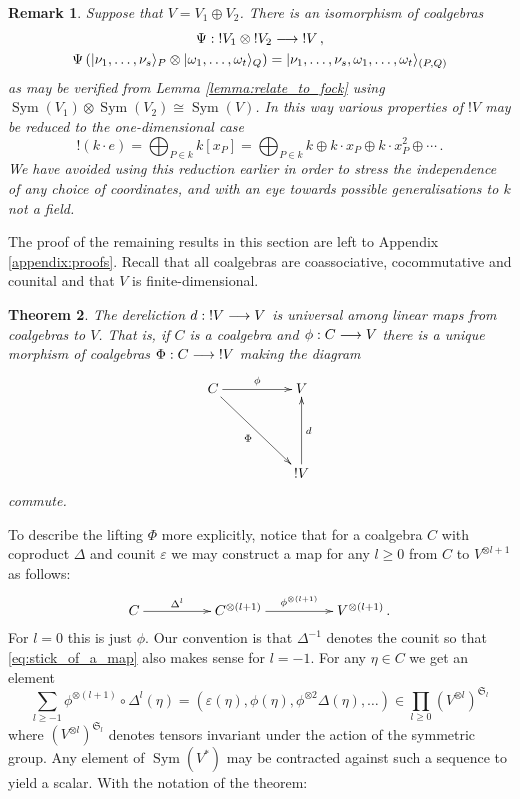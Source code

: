 \documentclass[english,letter paper,12pt,reqno]{article}
\DeclarePairedDelimiter\ket{\lvert}{\rangle}
\newtheorem{theorem}{Theorem}[section]
\theoremstyle{example}
\newtheorem{remark}[theorem]{Remark}
\numberwithin{equation}{section}
\DeclareMathOperator{\Sym}{Sym}
\begin{document}
\begin{remark}\label{remark_additive_iso} Suppose that $V = V_1 \oplus V_2$. There is an isomorphism of coalgebras
\begin{gather*}
\Psi: {!} V_1 \otimes {!} V_2 \lto {!} V\,,\\
\Psi\left( \ket{\nu_1,\ldots,\nu_s}_P \otimes \ket{\omega_1,\ldots,\omega_t}_Q \right) = \ket{\nu_1,\ldots,\nu_s,\omega_1,\ldots,\omega_t}_{(P,Q)}
\end{gather*}
as may be verified from Lemma \ref{lemma:relate_to_fock} using $\Sym(V_1) \otimes \Sym(V_2) \cong \Sym(V)$. In this way various properties of ${!} V$ may be reduced to the one-dimensional case
\[
{!} ( k \cdot e ) = \bigoplus_{P \in k} k[x_P] = \bigoplus_{P \in k} k \oplus k \cdot x_P \oplus k \cdot x_P^2 \oplus \cdots\,.
\]
We have avoided using this reduction earlier in order to stress the independence of any choice of coordinates, and with an eye towards possible generalisations to $k$ not a field.
\end{remark}

The proof of the remaining results in this section are left to Appendix \ref{appendix:proofs}. Recall that all coalgebras are coassociative, cocommutative and counital and that $V$ is finite-dimensional.

\begin{theorem}\label{theorem:main} The dereliction $d: {!}V \longrightarrow V$ is universal among linear maps from coalgebras to $V$. That is, if $C$ is a coalgebra and $\phi: C \longrightarrow V$ there is a unique morphism of coalgebras $\Phi: C \longrightarrow {!}V$ making the diagram
\begin{equation}\label{eq:defining_philift2}
\xymatrix@C+2pc@R+2pc{
C \ar[r]^-{\phi}\ar[dr]_-{\Phi} & V\\
& {!}V \ar[u]_-{d}
}
\end{equation}
commute.
\end{theorem}

To describe the lifting $\Phi$ more explicitly, notice that for a coalgebra $C$ with coproduct $\Delta$ and counit $\varepsilon$ we may construct a map for any $l \ge 0$ from $C$ to $V^{\otimes l+1}$ as follows:
\begin{equation}\label{eq:stick_of_a_map}
\xymatrix@C+2pc{
C \ar[r]^-{\Delta^l} & C^{\otimes (l+1)} \ar[r]^-{\phi^{\otimes (l+1)}} & V^{\otimes (l+1)}\,.
}
\end{equation}
For $l = 0$ this is just $\phi$. Our convention is that $\Delta^{-1}$ denotes the counit so that \eqref{eq:stick_of_a_map} also makes sense for $l = -1$. For any $\eta \in C$ we get an element
\begin{equation}\label{eq:sequence_of_powers}
\sum_{l \ge -1} \phi^{\otimes (l+1)} \circ \Delta^l(\eta) = ( \varepsilon(\eta), \phi(\eta), \phi^{\otimes 2} \Delta(\eta), \ldots ) \in \prod_{l \ge 0} (V^{\otimes l})^{\mathfrak{S}_l}
\end{equation}
where $(V^{\otimes l})^{\mathfrak{S}_l}$ denotes tensors invariant under the action of the symmetric group. Any element of $\Sym(V^*)$ may be contracted against such a sequence to yield a scalar. With the notation of the theorem:
\end{document}
